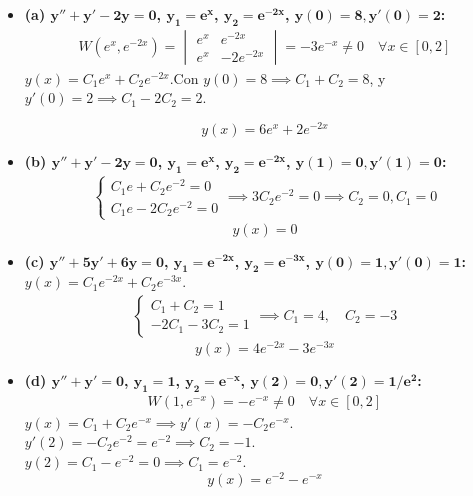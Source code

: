 \documentclass[11pt, a4paper]{article}
\begin{document}
\begin{itemize}
\item \textbf{(a) $\bm{y''+y'-2y=0}$, $\bm{y_1=e^x}$, $\bm{y_2=e^{-2x}}$, $\bm{y(0)=8, y'(0)=2}$:}
\begin{align*}
W(e^x, e^{-2x}) = \begin{vmatrix} e^x & e^{-2x} \\ e^x & -2e^{-2x} \end{vmatrix} = -3e^{-x} \neq 0 \quad \forall x \in [0,2]
\end{align*}
$y(x) = C_1 e^x + C_2 e^{-2x}$.Con $y(0)=8 \implies C_1 + C_2 = 8$, y $y'(0)=2 \implies C_1 - 2C_2 = 2$.

\[
\boxed{y(x) = 6e^x + 2e^{-2x}}
\]

\item \textbf{(b) $\bm{y''+y'-2y=0}$, $\bm{y_1=e^x}$, $\bm{y_2=e^{-2x}}$, $\bm{y(1)=0, y'(1)=0}$:}
\begin{align*}
\begin{cases} C_1 e + C_2 e^{-2} = 0 \\ C_1 e - 2C_2 e^{-2} = 0 \end{cases} \implies 3C_2 e^{-2} = 0 \implies C_2 = 0, C_1 = 0
\end{align*}
\[
\boxed{y(x) = 0}
\]

\item \textbf{(c) $\bm{y''+5y'+6y=0}$, $\bm{y_1=e^{-2x}}$, $\bm{y_2=e^{-3x}}$, $\bm{y(0)=1, y'(0)=1}$:}\\
$y(x) = C_1 e^{-2x} + C_2 e^{-3x}$.
\begin{align*}
\begin{cases} C_1 + C_2 = 1 \\ -2C_1 - 3C_2 = 1 \end{cases} \implies C_1 = 4, \quad C_2 = -3
\end{align*}
\[
\boxed{y(x) = 4e^{-2x} - 3e^{-3x}}
\]

\item \textbf{(d) $\bm{y''+y'=0}$, $\bm{y_1=1}$, $\bm{y_2=e^{-x}}$, $\bm{y(2)=0, y'(2)=1/e^2}$:}
\begin{align*}
W(1, e^{-x}) = -e^{-x} \neq 0 \quad \forall x \in [0,2]
\end{align*}
$y(x) = C_1 + C_2 e^{-x} \implies y'(x) = -C_2 e^{-x}$.\\
$y'(2) = -C_2 e^{-2} = e^{-2} \implies C_2 = -1$. \\
$y(2) = C_1 - e^{-2} = 0 \implies C_1 = e^{-2}$.\\
\[
\boxed{y(x) = e^{-2} - e^{-x}}
\]
\end{itemize}
\end{document}
